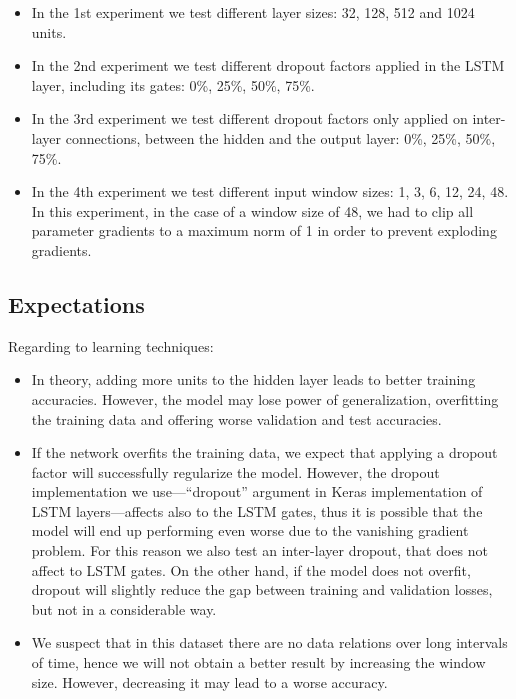 \documentclass[]{article}
\begin{document}
	\begin{itemize}
		\item In the 1st experiment we test different layer sizes: 32, 128, 512 and 1024 units.
		
		\item In the 2nd experiment we test different dropout factors applied in the LSTM layer, including its gates: 0\%, 25\%, 50\%, 75\%.
		
		\item In the 3rd experiment we test different dropout factors only applied on inter-layer connections, between the hidden and the output layer: 0\%, 25\%, 50\%, 75\%.
		
		\item In the 4th experiment we test different input window sizes: 1, 3, 6, 12, 24, 48. In this experiment, in the case of a window size of 48, we had to clip all parameter gradients to a maximum norm of 1 in order to prevent exploding gradients.
	\end{itemize}
	
	\subsection{Expectations}
	
	Regarding to learning techniques:
	
	\begin{itemize}
		\item In theory, adding more units to the hidden layer leads to better training accuracies. However, the model may lose power of generalization, overfitting the training data and offering worse validation and test accuracies.
		
		\item If the network overfits the training data, we expect that applying a dropout factor will successfully regularize the model. However, the dropout implementation we use---``dropout'' argument in Keras implementation of LSTM layers---affects also to the LSTM gates, thus it is possible that the model will end up performing even worse due to the vanishing gradient problem. For this reason we also test an inter-layer dropout, that does not affect to LSTM gates. On the other hand, if the model does not overfit, dropout will slightly reduce the gap between training and validation losses, but not in a considerable way.
		
		\item We suspect that in this dataset there are no data relations over long intervals of time, hence we will not obtain a better result by increasing the window size. However, decreasing it may lead to a worse accuracy.
	\end{itemize}
	
\end{document}
